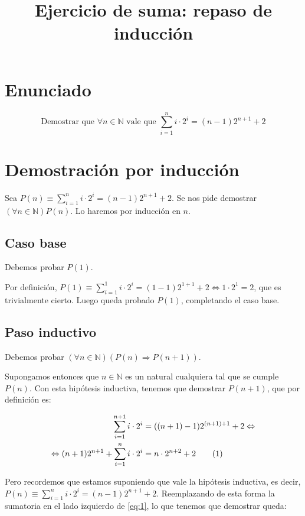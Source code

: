 \documentclass{article}
\title{Ejercicio de suma: repaso de inducción}
\author{}
\date{}
\newcommand\numberthis{\refstepcounter{equation}\tag{\theequation}}
\begin{document}
\maketitle

\section{Enunciado}

$$ \mbox{Demostrar que } \forall n \in \mathbb{N} \mbox{ vale que } \sum_{i=1}^{n}{i \cdot 2^i} = (n-1) 2^{n+1} + 2 $$

\section{Demostración por inducción}

Sea $P(n) \equiv \sum_{i=1}^{n}{i \cdot 2^i} = (n-1) 2^{n+1} + 2$. Se nos pide demostrar $(\forall n \in \mathbb{N}) P(n)$. Lo haremos por inducción en $n$.


\subsection{Caso base}
Debemos probar $P(1)$.

Por definición, $P(1) \equiv \sum_{i=1}^{1}{i \cdot 2^i} = (1-1) 2^{1+1} + 2 \Leftrightarrow 1 \cdot 2^1 = 2$, que es trivialmente cierto. Luego queda
probado $P(1)$, completando el caso base.

\subsection{Paso inductivo}
Debemos probar $(\forall n \in \mathbb{N}) (P(n) \Rightarrow P(n+1))$.

Supongamos entonces que $n \in \mathbb{N}$ es un natural cualquiera tal que se cumple $P(n)$. Con esta hipótesis inductiva, tenemos que demostrar $P(n+1)$, que por definición es:

\begin{align*}
\sum_{i=1}^{n+1}{i \cdot 2^i} & = ((n+1)-1) 2^{(n+1)+1} + 2 \Leftrightarrow \\
\Leftrightarrow (n+1) 2^{n+1} + \sum_{i=1}^{n}{i \cdot 2^i} & = n \cdot 2^{n+2} + 2 \numberthis \label{eq:1}
\end{align*}

Pero recordemos que estamos suponiendo que vale la hipótesis inductiva, es decir, \\ $P(n) \equiv \sum_{i=1}^{n}{i \cdot 2^i} = (n-1) 2^{n+1} + 2$.
Reemplazando de esta forma la sumatoria en el lado izquierdo de \ref{eq:1}, lo que tenemos que demostrar queda:
\end{document}
